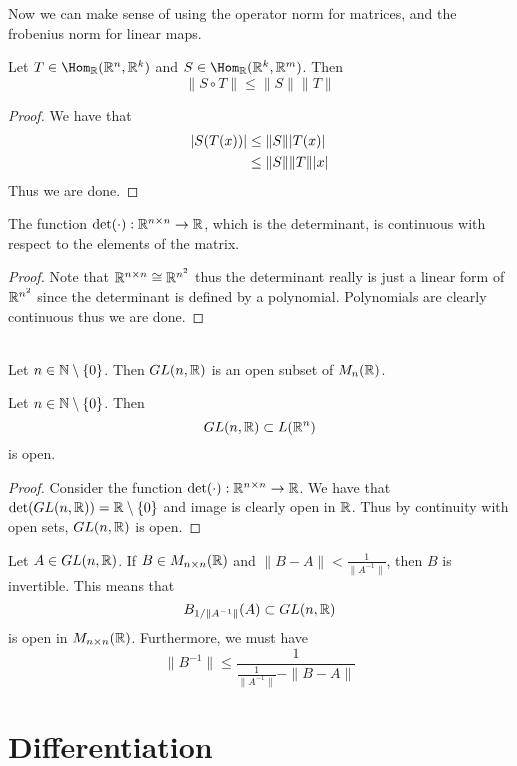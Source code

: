 \documentclass[a4paper]{article}
\begin{document}
Now we can make sense of using the operator norm for matrices, and the frobenius norm for linear maps. 

\begin{prp}{}{} Let $T\in\Hom_\R(\R^n,\R^k)$ and $S\in\Hom_\R(\R^k,\R^m)$. Then $$\|S\circ T\|\leq\|S\|\|T\|$$ 
\begin{proof}
We have that 
\begin{align*}
\abs{S(T(x))}&\leq\|S\|\abs{T(x)}\\
&\leq\|S\|\|T\|\abs{x}
\end{align*}
Thus we are done. 
\end{proof}
\end{prp}

\begin{prp}{}{} The function $\det(\cdot):\mathbb{R}^{n\times n}\to\mathbb{R}$, which is the determinant, is continuous with respect to the elements of the matrix. 
\begin{proof}
Note that $\mathbb{R}^{n\times n}\cong\mathbb{R}^{n^2}$ thus the determinant really is just a linear form of $\mathbb{R}^{n^2}$ since the determinant is defined by a polynomial. Polynomials are clearly continuous thus we are done. 
\end{proof}
\end{prp}

\begin{prp}{}{}\\
Let $n\in\mathbb{N}\setminus\{0\}$. Then $GL(n,\mathbb{R})$ is an open subset of $M_n(\mathbb{R})$. 
\end{prp}

\begin{prp}{}{} Let $n\in\mathbb{N}\setminus\{0\}$. Then $$GL(n,\mathbb{R})\subset L(\mathbb{R}^n)$$ is open. 
\begin{proof}
Consider the function $\det(\cdot):\mathbb{R}^{n\times n}\to\mathbb{R}$. We have that $\det(GL(n,\mathbb{R}))=\mathbb{R}\setminus\{0\}$ and image is clearly open in $\mathbb{R}$. Thus by continuity with open sets, $GL(n,\mathbb{R})$ is open. 
\end{proof}
\end{prp}

\begin{prp}{}{} Let $A\in GL(n,\mathbb{R})$. If $B\in M_{n\times n}(\mathbb{R})$ and $\|B-A\|<\frac{1}{\|A^{-1}\|}$, then $B$ is invertible. This means that $$B_{1/\|A^{-1}\|}(A)\subset GL(n,\mathbb{R})$$ is open in $M_{n\times n}(\mathbb{R})$. Furthermore, we must have $$\|B^{-1}\|\leq\frac{1}{\frac{1}{\|A^{-1}\|}-\|B-A\|}$$
\end{prp}

\pagebreak
\section{Differentiation}
\end{document}

